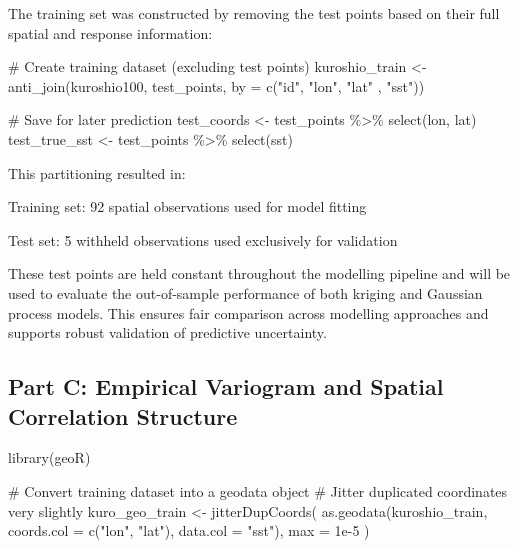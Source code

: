 \documentclass[
  11pt,
]{article}
\newenvironment{Shaded}{\begin{snugshade}}{\end{snugshade}}
\newcommand{\AttributeTok}[1]{\textcolor[rgb]{0.40,0.45,0.13}{#1}}
\newcommand{\CommentTok}[1]{\textcolor[rgb]{0.37,0.37,0.37}{#1}}
\newcommand{\FloatTok}[1]{\textcolor[rgb]{0.68,0.00,0.00}{#1}}
\newcommand{\FunctionTok}[1]{\textcolor[rgb]{0.28,0.35,0.67}{#1}}
\newcommand{\NormalTok}[1]{\textcolor[rgb]{0.00,0.23,0.31}{#1}}
\newcommand{\OtherTok}[1]{\textcolor[rgb]{0.00,0.23,0.31}{#1}}
\newcommand{\SpecialCharTok}[1]{\textcolor[rgb]{0.37,0.37,0.37}{#1}}
\newcommand{\StringTok}[1]{\textcolor[rgb]{0.13,0.47,0.30}{#1}}
\begin{document}
The training set was constructed by removing the test points based on
their full spatial and response information:

\begin{Shaded}
\begin{Highlighting}[]
\CommentTok{\# Create training dataset (excluding test points)}
\NormalTok{kuroshio\_train }\OtherTok{\textless{}{-}} \FunctionTok{anti\_join}\NormalTok{(kuroshio100, test\_points, }\AttributeTok{by =} \FunctionTok{c}\NormalTok{(}\StringTok{"id"}\NormalTok{, }\StringTok{"lon"}\NormalTok{, }\StringTok{"lat"}
\NormalTok{                                                             , }\StringTok{"sst"}\NormalTok{))}

\CommentTok{\# Save for later prediction}
\NormalTok{test\_coords }\OtherTok{\textless{}{-}}\NormalTok{ test\_points }\SpecialCharTok{\%\textgreater{}\%} \FunctionTok{select}\NormalTok{(lon, lat)}
\NormalTok{test\_true\_sst }\OtherTok{\textless{}{-}}\NormalTok{ test\_points }\SpecialCharTok{\%\textgreater{}\%} \FunctionTok{select}\NormalTok{(sst)}
\end{Highlighting}
\end{Shaded}

This partitioning resulted in:

Training set: 92 spatial observations used for model fitting

Test set: 5 withheld observations used exclusively for validation

These test points are held constant throughout the modelling pipeline
and will be used to evaluate the out-of-sample performance of both
kriging and Gaussian process models. This ensures fair comparison across
modelling approaches and supports robust validation of predictive
uncertainty.

\subsection{Part C: Empirical Variogram and Spatial Correlation
Structure}\label{part-c-empirical-variogram-and-spatial-correlation-structure}

\begin{Shaded}
\begin{Highlighting}[]
\FunctionTok{library}\NormalTok{(geoR)}

\CommentTok{\# Convert training dataset into a geodata object}
\CommentTok{\# Jitter duplicated coordinates very slightly}
\NormalTok{kuro\_geo\_train }\OtherTok{\textless{}{-}} \FunctionTok{jitterDupCoords}\NormalTok{(}
  \FunctionTok{as.geodata}\NormalTok{(kuroshio\_train, }\AttributeTok{coords.col =} \FunctionTok{c}\NormalTok{(}\StringTok{"lon"}\NormalTok{, }\StringTok{"lat"}\NormalTok{), }\AttributeTok{data.col =} \StringTok{"sst"}\NormalTok{),}
  \AttributeTok{max =} \FloatTok{1e{-}5}
\NormalTok{)}
\end{Highlighting}
\end{Shaded}
\end{document}
